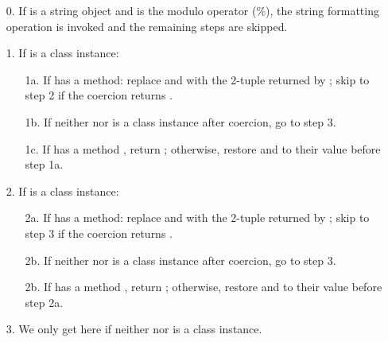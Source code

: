 \begin{itemize}

\item[0.] If  is a string object and  is the modulo
        operator (\%), the string formatting operation is invoked and
        the remaining steps are skipped.

\item[1.] If  is a class instance:

        \begin{itemize}

        \item[1a.] If  has a  method:
        replace  and  with the 2-tuple returned by
        ; skip to step 2 if the
        coercion returns .

        \item[1b.] If neither  nor  is a class instance
        after coercion, go to step 3.

        \item[1c.] If  has a method , return
        ; otherwise, restore  and
         to their value before step 1a.

        \end{itemize}

\item[2.] If  is a class instance:

        \begin{itemize}

        \item[2a.] If  has a  method:
        replace  and  with the 2-tuple returned by
        ; skip to step 3 if the
        coercion returns .

        \item[2b.] If neither  nor  is a class instance
        after coercion, go to step 3.

        \item[2b.] If  has a method ,
        return ; otherwise,
        restore  and  to their value before step 2a.

        \end{itemize}

\item[3.] We only get here if neither  nor  is a class
instance.


\end{itemize}
